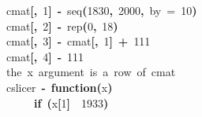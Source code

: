 \documentclass[a4paper]{article}
\newcommand{\hlnumber}[1]{\textcolor[rgb]{0.0823529411764706,0.0784313725490196,0.709803921568627}{#1}}%
\newcommand{\hlfunctioncall}[1]{\textcolor[rgb]{1,0,0}{#1}}%
\newcommand{\hlkeyword}[1]{\textcolor[rgb]{0,0,0}{\textbf{#1}}}%
\newcommand{\hlargument}[1]{\textcolor[rgb]{0.694117647058824,0.247058823529412,0.0196078431372549}{#1}}%
\newcommand{\hlcomment}[1]{\textcolor[rgb]{0.8,0.8,0.8}{#1}}%
\newcommand{\hlformalargs}[1]{\textcolor[rgb]{0.0705882352941176,0.713725490196078,0.0705882352941176}{#1}}%
\newcommand{\hlassignement}[1]{\textcolor[rgb]{0.215686274509804,0.215686274509804,0.384313725490196}{\textbf{#1}}}%
\newcommand{\hlsymbol}[1]{\textcolor[rgb]{0,0,0}{#1}}%
\newcommand{\hlprompt}[1]{\textcolor[rgb]{0,0,0}{#1}}%
\newcommand{\hlstd}[1]{\textcolor[rgb]{0,0,0}{#1}}%
\newenvironment{Houtput}{\raggedright}{%
%
}
\begin{document}
\begin{Houtput}
\hlstd{}\ttfamily\noindent
\hlprompt{\usebox{\hlnormalsizeboxgreaterthan}{\ }}\hlsymbol{cmat}\hlkeyword{[}\hlkeyword{,}{\ }\hlnumber{1}\hlkeyword{]}{\ }\hlassignement{\usebox{\hlnormalsizeboxlessthan}-}{\ }\hlfunctioncall{seq}\hlkeyword{(}\hlnumber{1830}\hlkeyword{,}{\ }\hlnumber{2000}\hlkeyword{,}{\ }\hlargument{by}{\ }\hlargument{=}{\ }\hlnumber{10}\hlkeyword{)}\mbox{}
\normalfont
\hspace*{\fill}\\
\hlstd{}\ttfamily\noindent
\hlprompt{\usebox{\hlnormalsizeboxgreaterthan}{\ }}\hlsymbol{cmat}\hlkeyword{[}\hlkeyword{,}{\ }\hlnumber{2}\hlkeyword{]}{\ }\hlassignement{\usebox{\hlnormalsizeboxlessthan}-}{\ }\hlfunctioncall{rep}\hlkeyword{(}\hlnumber{0}\hlkeyword{,}{\ }\hlnumber{18}\hlkeyword{)}\mbox{}
\normalfont
\hspace*{\fill}\\
\hlstd{}\ttfamily\noindent
\hlprompt{\usebox{\hlnormalsizeboxgreaterthan}{\ }}\hlsymbol{cmat}\hlkeyword{[}\hlkeyword{,}{\ }\hlnumber{3}\hlkeyword{]}{\ }\hlassignement{\usebox{\hlnormalsizeboxlessthan}-}{\ }\hlsymbol{cmat}\hlkeyword{[}\hlkeyword{,}{\ }\hlnumber{1}\hlkeyword{]}{\ }\hlkeyword{+}{\ }\hlnumber{111}\mbox{}
\normalfont
\hspace*{\fill}\\
\hlstd{}\ttfamily\noindent
\hlprompt{\usebox{\hlnormalsizeboxgreaterthan}{\ }}\hlsymbol{cmat}\hlkeyword{[}\hlkeyword{,}{\ }\hlnumber{4}\hlkeyword{]}{\ }\hlassignement{\usebox{\hlnormalsizeboxlessthan}-}{\ }\hlnumber{111}\mbox{}
\normalfont
\hspace*{\fill}\\
\hlstd{}\ttfamily\noindent
\hlprompt{\usebox{\hlnormalsizeboxgreaterthan}{\ }}\hlcomment{\usebox{\hlnormalsizeboxhash}{\ }the{\ }x{\ }argument{\ }is{\ }a{\ }row{\ }of{\ }cmat}\mbox{}
\normalfont
\hspace*{\fill}\\
\hlstd{}\ttfamily\noindent
\hlprompt{\usebox{\hlnormalsizeboxgreaterthan}{\ }}\hlsymbol{cslicer}{\ }\hlassignement{\usebox{\hlnormalsizeboxlessthan}-}{\ }\hlkeyword{function}\hlkeyword{(}\hlformalargs{x}\hlkeyword{)}{\ }\hlkeyword{\usebox{\hlnormalsizeboxopenbrace}}\hspace*{\fill}\\
\hlstd{}\hlprompt{{\ }}{\ }{\ }{\ }{\ }\hlkeyword{if}{\ }\hlkeyword{(}\hlsymbol{x}\hlkeyword{[}\hlnumber{1}\hlkeyword{]}{\ }\hlkeyword{\usebox{\hlnormalsizeboxlessthan}}{\ }\hlnumber{1933}\hlkeyword{)}{\ }\hlkeyword{\usebox{\hlnormalsizeboxopenbrace}}\hspace*{\fill}\\

\end{Houtput}
\end{document}
